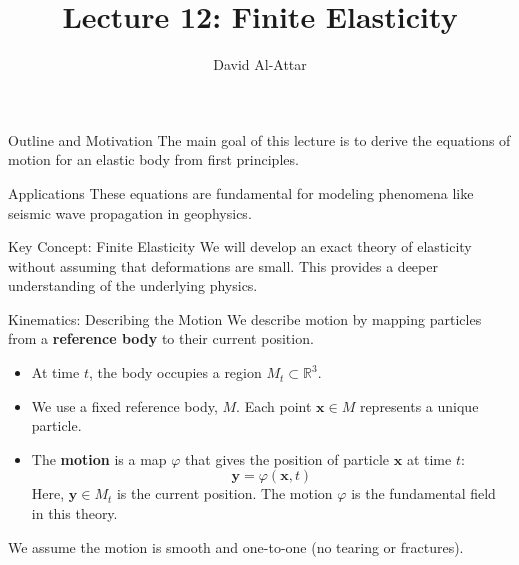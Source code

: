 \documentclass{beamer}
\title[Lecture 12: Finite Elasticity]{Lecture 12: Finite Elasticity}
\author{David Al-Attar}
\institute{Michaelmas term 2024}
\date{}
\begin{document}

\begin{frame}
    \titlepage
\end{frame}

\begin{frame}{Outline and Motivation}
    The main goal of this lecture is to derive the equations of motion for an elastic body from first principles.
    \pause
    \begin{block}{Applications}
        These equations are fundamental for modeling phenomena like seismic wave propagation in geophysics.
    \end{block}
    \pause
    \begin{alertblock}{Key Concept: Finite Elasticity}
        We will develop an exact theory of elasticity without assuming that deformations are small. This provides a deeper understanding of the underlying physics.
    \end{alertblock}
\end{frame}


\begin{frame}{Kinematics: Describing the Motion}
    We describe motion by mapping particles from a \textbf{reference body} to their current position.
    
    \begin{itemize}
        \item At time $t$, the body occupies a region $M_t \subset \mathbb{R}^3$.
        \item We use a fixed reference body, $M$. Each point $\mathbf{x} \in M$ represents a unique particle.
        \item The \textbf{motion} is a map $\varphi$ that gives the position of particle $\mathbf{x}$ at time $t$:
        $$ \mathbf{y} = \varphi(\mathbf{x}, t) $$
        Here, $\mathbf{y} \in M_t$ is the current position. The motion $\varphi$ is the fundamental field in this theory.
    \end{itemize}
    \pause
    We assume the motion is smooth and one-to-one (no tearing or fractures).
\end{frame}
\end{document}
